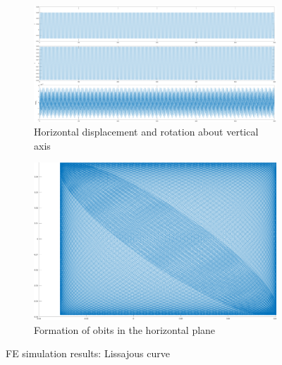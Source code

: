 \documentclass{article}
\begin{document}
\begin{figure}
\centering
    \begin{subfigure}[b]{0.45\textwidth}
        \centering
        \includegraphics[width=\textwidth]{figures/FEA_simu_Lissa_Displacement.png}
        \caption{\small{Horizontal displacement and rotation about vertical axis}}
        \label{fig:fea:lissa_displ}
    \end{subfigure}
    \begin{subfigure}[b]{0.45\textwidth}
        \centering
        \includegraphics[width=\textwidth]{figures/FEA_simu_Lissa_Orbits.png}
        \caption{\small{Formation of obits in the horizontal plane}}
        \label{fig:fea:lissa_orbits}
    \end{subfigure}
\caption{FE simulation results: Lissajous curve}
    \label{fig:fea:lissa_simu_results}
\end{figure}
\end{document}
